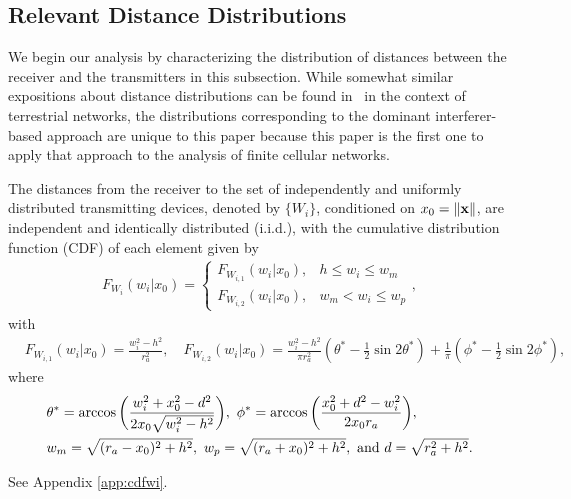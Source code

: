 \documentclass[journal,draftclsnofoot,onecolumn,12pt]{IEEEtran}
\begin{document}
\subsection{Relevant Distance Distributions}
We begin our analysis by characterizing the distribution of distances between the receiver and the transmitters in this subsection. While somewhat similar expositions about distance distributions can be found in~\cite{mehrnazbpp,khaDurJ2013} in the context of terrestrial networks, the distributions corresponding to the dominant interferer-based approach are unique to this paper because this paper is the first one to apply that approach to the analysis of finite cellular networks.

\begin{lemma}\label{lem:cdfwi}
The distances from the receiver to the set of independently and uniformly distributed transmitting devices, denoted by $\{W_i\}$, conditioned on $x_0 = \|{\bf{x}}\|$, are independent and identically distributed (i.i.d.), with the cumulative distribution function (CDF) of each element given by 
\begin{align}
F_{W_i}(w_i | x_0) =  
\begin{cases}
	F_{W_{i,1}}(w_i | x_0 ), &     h \leq w_i \leq w_m \\
	F_{W_{i,2}}(w_i | x_0 ), &     w_m < w_i \leq w_p
\end{cases}
,
\end{align}
with 
\begin{align}
&F_{W_{i,1}}(w_i | x_0 ) = \frac{w_i^2-h^2}{r_a^2}, \quad F_{W_{i,2}}(w_i | x_0 ) = \frac{w_i^2-h^2}{\pi r_a^2}\left(\theta^* - \frac{1}{2}\sin 2\theta^*\right) + \frac{1}{\pi}\left(\phi^* - \frac{1}{2}\sin 2\phi^*\right), 
\end{align}
where
\begin{align}\notag
&\theta^* = \arccos\bigg(\frac{w_i^2+x_0^2-d^2}{2 x_0 \sqrt{w_i^2-h^2} }\bigg),\ \phi^* = \arccos\bigg(\frac{x_0^2+d^2-w_i^2}{2 x_0 r_a}\bigg), \\ \notag &w_m = \sqrt{(r_a-x_0)^2 + h^2},\ w_p = \sqrt{(r_a+x_0)^2 + h^2}, \text{ and } d = \sqrt{r_a^2 + h^2}. 
\end{align} 
\end{lemma}
\begin{IEEEproof}
See Appendix \ref{app:cdfwi}. 
\end{IEEEproof}
\end{document}
